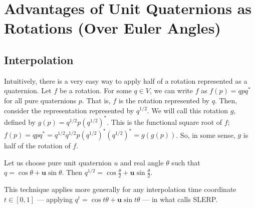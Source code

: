 \documentclass[12pt, letterpaper]{article}
\renewcommand{\b}[1]{\mathbf{#1}}
\begin{document}
\section{Advantages of Unit Quaternions as Rotations (Over Euler Angles)}

\subsection{Interpolation}

Intuitively, there is a very easy way to apply half of a rotation represented as a quaternion. Let $f$ be a rotation. For some $q\in V$, we can write $f$ as $f(p)=qpq^*$ for all pure quaternions $p$. That is, $f$ is the rotation represented by $q$. Then, consider the representation represented by $q^{1/2}$. We will call this rotation $g$, defined by $g(p)=q^{1/2}p(q^{1/2})^*$. This is the functional square root of $f$; $f(p)=qpq^*=q^{1/2}q^{1/2}p(q^{1/2})^*(q^{1/2})^*=g(g(p))$. So, in some sense, $g$ is half of the rotation of $f$.

Let us choose pure unit quaternion $u$ and real angle $\theta$ such that $q=\cos \theta + \b{u} \sin \theta$. Then $q^{1/2}=\cos \frac{\theta}{2} + \b{u} \sin \frac{\theta}{2}$.

This technique applies more generally for any interpolation time coordinate $t \in [0,1]$ --- applying $q^t=\cos{t\theta} + \b{u} \sin{t\theta}$ --- in what \cite{hanson} calls SLERP.

\section{}

\medskip

\printbibliography
\end{document}
